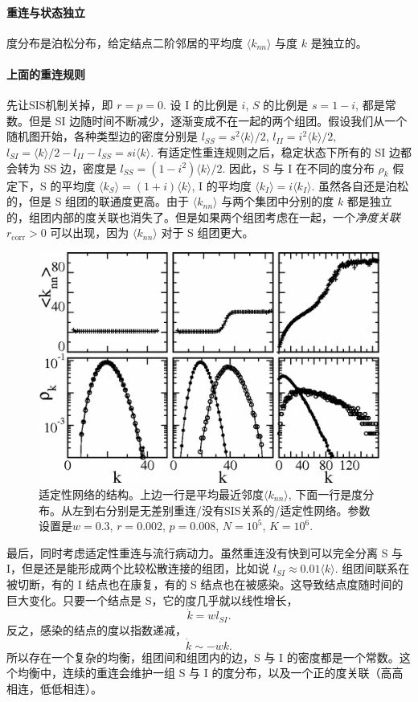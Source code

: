 \paragraph{重连与状态独立}

度分布是泊松分布，给定结点二阶邻居的平均度 $\langle k_{nn} \rangle$ 与度 $k$ 是独立的。

\paragraph{上面的重连规则}

先让SIS机制关掉，即 $r = p = 0$. 设 I 的比例是 $i$, $S$ 的比例是 $s = 1-i$, 都是常数。但是 SI 边随时间不断减少，逐渐变成不在一起的两个组团。假设我们从一个随机图开始，各种类型边的密度分别是 $l_{SS}=s^2\langle k\rangle /2 $, $l_{II}=i^2\langle k\rangle /2 $, $l_{SI}= \langle k\rangle /2 - l_{II} - l_{SS} = si\langle k\rangle $. 有适定性重连规则之后，稳定状态下所有的 SI 边都会转为 SS 边，密度是 $l_{SS} = (1-i^2)\langle k \rangle/2$. 因此，S 与 I 在不同的度分布 $\rho_k$ 假定下，S 的平均度 $\langle k_S \rangle = (1+i)\langle k\rangle $, I 的平均度 $\langle k_I \rangle = i\langle k_I \rangle$. 虽然各自还是泊松的，但是 S 组团的联通度更高。由于 $ \langle k_{nn} \rangle$ 与两个集团中分别的度 $k$ 都是独立的，组团内部的度关联也消失了。但是如果两个组团考虑在一起，一个\textit{净度关联} $r_\text{corr} > 0$ 可以出现，因为 $\langle k_{nn} \rangle$ 对于 S 组团更大。

\begin{figure}
    \centering
    \includegraphics[width = 0.5\linewidth]{Pics/rewire-structure-of-adaptive-networks.png}
    \caption{适定性网络的结构。上边一行是平均最近邻度$\langle k_{nn} \rangle$, 下面一行是度分布。从左到右分别是无差别重连/没有SIS关系的/适定性网络。参数设置是$w = 0.3$, $r = 0.002$, $p = 0.008$, $N = 10^5$, $K = 10^6$.}\label{fig:rewire-structure}
\end{figure}

最后，同时考虑适定性重连与流行病动力。虽然重连没有快到可以完全分离 S 与 I，但是还是能形成两个比较松散连接的组团，比如说 $l_{SI} \approx 0.01\langle k \rangle$. 组团间联系在被切断，有的 I 结点也在康复，有的 S 结点也在被感染。这导致结点度随时间的巨大变化。只要一个结点是 S，它的度几乎就以线性增长，\begin{equation}
    \dot{k} = wl_{SI}.
\end{equation} 反之，感染的结点的度以指数递减，\begin{equation}
    \dot{k} \sim -wk.
\end{equation}所以存在一个复杂的均衡，组团间和组团内的边，S 与 I 的密度都是一个常数。这个均衡中，连续的重连会维护一组 S 与 I 的度分布，以及一个正的度关联（高高相连，低低相连）。

